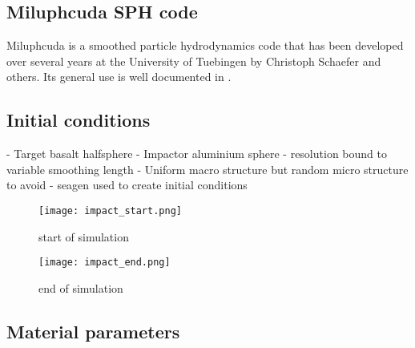 \subsection{Miluphcuda SPH code}
Miluphcuda is a smoothed particle hydrodynamics code that has been developed over several years at the University of Tuebingen by Christoph Schaefer and others. Its general use is well documented in \cite{Schaefer_2016}.


\subsection{Initial conditions}
- Target basalt halfsphere
- Impactor aluminium sphere
- resolution bound to variable smoothing length
- Uniform macro structure but random micro structure to avoid
- seagen \cite{github:SEAGen} used to create initial conditions

\begin{figure}[H]
    \centering
    \texttt{[image: impact\_start.png]}
    \caption{start of simulation}
    \label{fig:impact_start}
\end{figure}

\begin{figure}[H]
    \centering
    \texttt{[image: impact\_end.png]}
    \caption{end of simulation}
    \label{fig:impact_end}
\end{figure}

\subsection{Material parameters}

